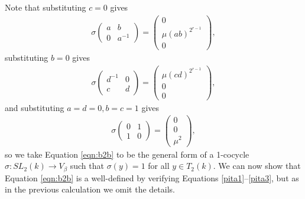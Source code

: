 Note that substituting $c=0$ gives
\begin{align*}
\sigma\left(\begin{matrix}a & b \\ 0 & a^{-1}\end{matrix}\right) = \left(\begin{matrix}0 \\ \mu(ab)^{2^{r-1}}\\ 0\end{matrix}\right),
\end{align*}
substituting $b=0$ gives
\begin{align*}
\sigma\left(\begin{matrix}d^{-1} & 0 \\ c & d\end{matrix}\right) = \left(\begin{matrix}\mu(cd)^{2^{r-1}} \\ 0 \\0 \end{matrix}\right),
\end{align*}
and substituting $a = d = 0, b = c=1$ gives
\begin{align*}
\sigma\left(\begin{matrix}0 & 1 \\ 1 & 0\end{matrix}\right) = \left(\begin{matrix}0  \\ 0\\ \mu^2\end{matrix}\right),
\end{align*}
so we take Equation \ref{eqn:b2b} to be the general form of a 1-cocycle $\sigma:SL_2(k)\rightarrow V_\beta$ such that $\sigma(y) = 1$ for all  $y\in T_2(k)$. We can now show that Equation \ref{eqn:b2b} is a well-defined by verifying Equations \ref{pita1}--\ref{pita3}, but as in the previous calculation we omit the details.

